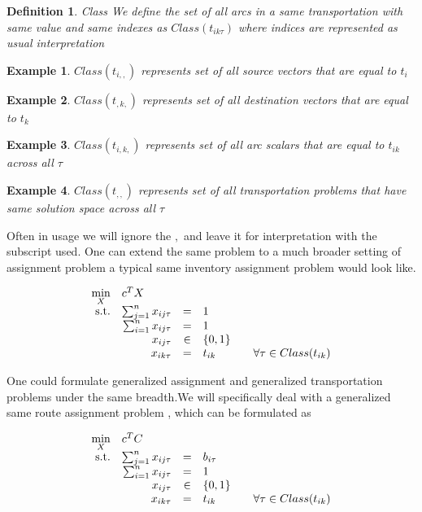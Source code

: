 \documentclass[a4paper]{article}
\newtheorem{definition}{Definition}[section]
\newtheorem{example}{Example}[definition]
\begin{document}
    \theoremstyle{plain}
    \begin{definition}{Class}
    We define the set of all arcs in a same transportation with same value and same indexes as $Class(t_{ik\tau})$ 
    where indices are represented as usual interpretation
    \end{definition}
    \begin{example}
    $Class(t_{i,,})$ represents set of all source vectors that are equal to $t_{i}$
    \end{example}
    \begin{example}
    $Class(t_{,k,})$ represents set of all destination vectors that are equal to $t_{k}$
    \end{example}
    \begin{example}
    $Class(t_{i,k,})$ represents set of all arc scalars that are equal to $t_{ik}$ across all $\tau$
    \end{example}
    \begin{example}
    $Class(t_{,,})$ represents set of all transportation problems that have same solution space across all $\tau$
    \end{example}
    
    Often in usage we will ignore the $,$ and leave it for interpretation with the subscript used.
    One can extend the same problem to a much broader setting of assignment problem a typical same inventory assignment problem would look like.

        \begin{equation}
        \begin{array}{rrclcl}
        \displaystyle \min_{X} & \multicolumn{3}{l}{c^T X} \\
        \textrm{s.t.} & \sum_{j=1}^n x_{ij\tau}  & = & 1 \\
        & \sum_{i=1}^n x_{ij\tau}  & = & 1 \\
        & x_{ij\tau} & \in &\{0,1\} \\
        & x_{ik\tau} &= & t_{ik} && \forall {\tau}\in Class(t_{ik}) \\
        \end{array}
        \end{equation}
        
    One could formulate generalized assignment and generalized transportation problems under the same breadth.We will specifically deal with a generalized same route assignment problem , which can be formulated as
    
        \begin{equation}
        \begin{array}{rrclcl}
        \displaystyle \min_{X} & \multicolumn{3}{l}{c^T C} \\
        \textrm{s.t.} & \sum_{j=1}^n x_{ij\tau}  & = & b_{i\tau} \\
        & \sum_{i=1}^n x_{ij\tau}  & = & 1 \\
        & x_{ij\tau} & \in &\{0,1\} \\
        & x_{ik\tau} &= & t_{ik} && \forall {\tau}\in Class(t_{ik}) \\
        \end{array}
        \end{equation}
\end{document}

